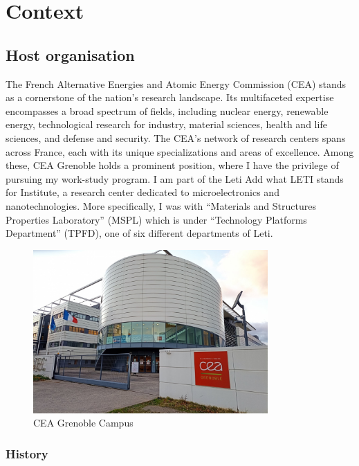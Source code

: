\section{Context}
\subsection{Host organisation}

\medskip

The French Alternative Energies and Atomic Energy Commission (CEA) stands as a cornerstone
of the nation's research landscape. Its multifaceted expertise encompasses a broad spectrum
of fields, including nuclear energy, renewable energy, technological research for industry, material sciences, health and life sciences, and defense and security. The CEA's network
of research centers spans across France, each with its unique specializations and areas
of excellence. Among these, CEA Grenoble holds a prominent position, where I have the 
privilege of pursuing my work-study program. I am part of the Leti \color{red} Add what LETI stands for\color{black} Institute,
a research center dedicated to microelectronics and nanotechnologies. More specifically, 
I was with “Materials and Structures Properties Laboratory” (MSPL) which is under “Technology Platforms 
Department” (TPFD), one of six different departments of Leti.


\begin{figure}[h!]
    \centering
    \includegraphics[width=0.8\textwidth]{images/ceaphoto.jpg}
    \caption{CEA Grenoble Campus}
\end{figure}

\FloatBarrier

\subsubsection{History}

